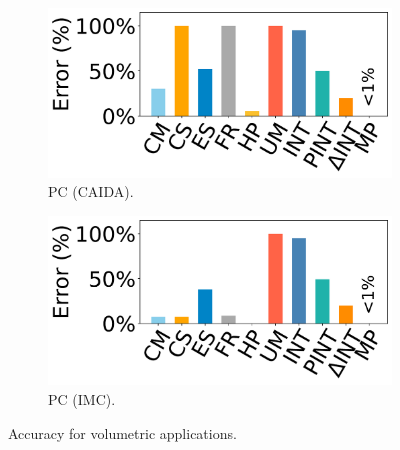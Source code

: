 \begin{figure}[t]
    \begin{subfigure}{0.49\linewidth}
    \centering
    \includegraphics[width=\linewidth]{pics/pc-caida.pdf}
    \vspace{-20pt}
    \caption{PC (CAIDA).}
    \end{subfigure}
    \begin{subfigure}{0.49\linewidth}
    \centering
    \includegraphics[width=\linewidth]{pics/pc-imc.pdf}
    \vspace{-20pt}
    \caption{PC (IMC).}
    \end{subfigure}
    \caption{Accuracy for volumetric applications.}
    \vspace{-2pt}
    \label{fig:volumetric-acc}
\end{figure}

